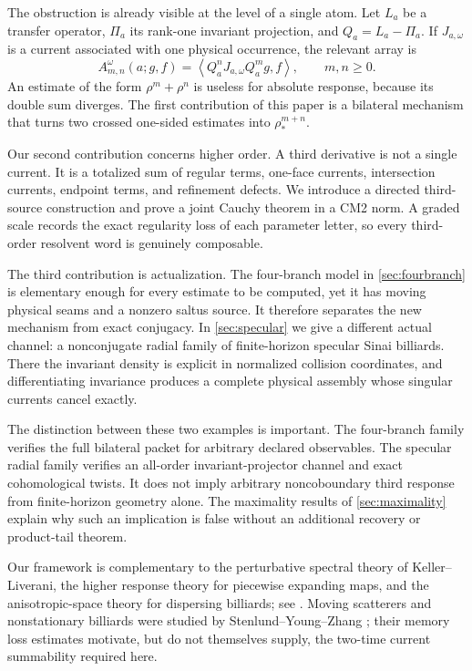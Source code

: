 \documentclass[11pt,reqno]{amsart}
\theoremstyle{definition}
\theoremstyle{remark}
\newcommand{\pair}[2]{\left\langle #1,#2\right\rangle}
\begin{document}
The obstruction is already visible at the level of a single atom.  Let $L_a$
be a transfer operator, $\Pi_a$ its rank-one invariant projection, and
$Q_a=L_a-\Pi_a$.  If $J_{a,\omega}$ is a current associated with one physical
occurrence, the relevant array is
\begin{equation}\label{eq:intro-array}
 A_{m,n}^{\omega}(a;g,f)
 =\pair{Q_a^nJ_{a,\omega}Q_a^m g}{f},
 \qquad m,n\ge0.
\end{equation}
An estimate of the form $\rho^m+\rho^n$ is useless for absolute response,
because its double sum diverges.  The first contribution of this paper is a
bilateral mechanism that turns two crossed one-sided estimates into
$\rho_*^{m+n}$.

Our second contribution concerns higher order.  A third derivative is not a
single current.  It is a totalized sum of regular terms, one-face currents,
intersection currents, endpoint terms, and refinement defects.  We introduce a
directed third-source construction and prove a joint Cauchy theorem in a CM2
norm.  A graded scale records the exact regularity loss of each parameter
letter, so every third-order resolvent word is genuinely composable.

The third contribution is actualization.  The four-branch model in
\cref{sec:fourbranch} is elementary enough for every estimate to be computed,
yet it has moving physical seams and a nonzero saltus source.  It therefore
separates the new mechanism from exact conjugacy.  In
\cref{sec:specular} we give a different actual channel: a nonconjugate radial
family of finite-horizon specular Sinai billiards.  There the invariant density
is explicit in normalized collision coordinates, and differentiating
invariance produces a complete physical assembly whose singular currents
cancel exactly.

The distinction between these two examples is important.  The four-branch
family verifies the full bilateral packet for arbitrary declared observables.
The specular radial family verifies an all-order invariant-projector channel
and exact cohomological twists.  It does not imply arbitrary noncoboundary
third response from finite-horizon geometry alone.  The maximality results of
\cref{sec:maximality} explain why such an implication is false without an
additional recovery or product-tail theorem.

Our framework is complementary to the perturbative spectral theory of
Keller--Liverani, the higher response theory for piecewise expanding maps, and
the anisotropic-space theory for dispersing billiards; see
\cite{BaladiSmania2008,KellerLiverani1999,DemersLiverani2008,
BaladiDemersLiverani2018}.  Moving scatterers and nonstationary billiards were
studied by Stenlund--Young--Zhang \cite{StenlundYoungZhang2013}; their memory
loss estimates motivate, but do not themselves supply, the two-time current
summability required here.
\end{document}
